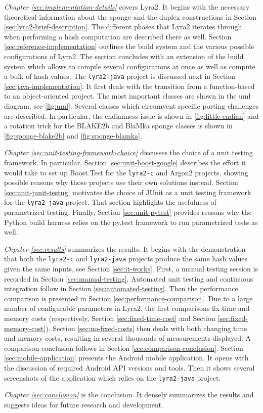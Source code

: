 \emph{Chapter \ref{sec:implementation-details}} covers Lyra2. It begins with the necessary theoretical information about the sponge and the duplex constructions in Section \ref{sec:lyra2-brief-description}. The different phases that Lyra2 iterates through when performing a hash computation are described there as well. Section \ref{sec:reference-implementation} outlines the build system and the various possible configurations of Lyra2. The section concludes with an extension of the build system which allows to compile several configurations at once as well as compute a bulk of hash values. The \texttt{lyra2-java} project is discussed next in Section \ref{sec:java-implementation}. It first deals with the transition from a function-based to an object-oriented project. The most important classes are shown in the \gls{uml} diagram, see \autoref{fig:uml}. Several classes which circumvent specific porting challenges are described. In particular, the endianness issue is shown in \autoref{fig:little-endian} and a rotation trick for the BLAKE2b and BlaMka sponge classes is shown in \autoref{fig:sponge-blake2b} and \autoref{fig:sponge-blamka}.

\emph{Chapter \ref{sec:unit-testing-framework-choice}} discusses the choice of a unit testing framework. In particular, Section \ref{sec:unit-boost-google} describes the effort it would take to set up Boost.Test for the \texttt{lyra2-c} and Argon2 projects, showing possible reasons why those projects use their own solutions instead. Section \ref{sec:unit-junit-testng} motivates the choice of JUnit as a unit testing framework for the \texttt{lyra2-java} project. That section highlights the usefulness of parametrized testing. Finally, Section \ref{sec:unit-pytest} provides reasons why the Python build harness relies on the py.test framework to run parametrized tests as well.

\emph{Chpater \ref{sec:results}} summarizes the results. It begins with the demonstration that both the \texttt{lyra2-c} and \texttt{lyra2-java} projects produce the same hash values given the same inputs, see Section \ref{sec:it-works}. First, a manual testing session is recorded in Section \ref{sec:manual-testing}. Automated unit testing and continuous integration follow in Section \ref{sec:automated-testing}. Then the performance comparison is presented in Section \ref{sec:performance-comparison}. Due to a large number of configurable parameters in Lyra2, the first comparisons fix time and memory costs (respectively, Section \ref{sec:fixed-time-cost} and Section \ref{sec:fixed-memory-cost}). Section \ref{sec:no-fixed-costs} then deals with both changing time and memory costs, resulting in several thousands of measurements displayed. A comparison conclusion follows in Section \ref{sec:comparison-conclusion}. Section \ref{sec:mobile-application} presents the Android mobile application. It opens with the discussion of required Android API versions and tools. Then it shows several screenshots of the application which relies on the \texttt{lyra2-java} project.

\emph{Chapter \ref{sec:conclusion}} is the conclusion. It densely summarizes the results and suggests ideas for future research and development.
